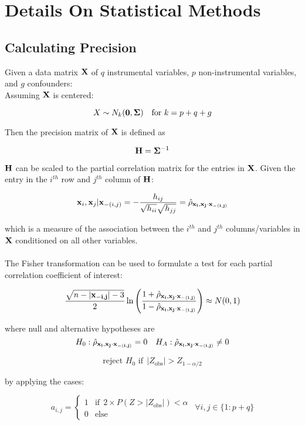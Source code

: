 \documentclass[12pt]{report}
\begin{document}
\section*{Details On Statistical Methods}

\subsection*{Calculating Precision}

Given a data matrix ${\bf X}$ of $q$ instrumental variables, $p$ non-instrumental variables, and $g$ confounders:\\
Assuming $\bf X$ is centered:

\[ X \sim N_k({\bf 0}, {\bf\Sigma})  \ \ \ \text{for} \ k=p+q+g\]
 
Then the precision matrix of $\bf X$ is defined as 

\[  {\bf H} = {\bf \Sigma}^{-1} \]

$\bf H$ can be scaled to the partial correlation matrix for the entries in $\bf X$. Given the entry in the $i^{th}$ row and $j^{th}$ column of $\bf H$:

\[  {\bf x}_i, {\bf x}_j | {\bf x}_{-(i,j)} = - \frac{h_{ij}}{\sqrt{h_{ii}}\sqrt{h_{jj}}} = \hat{\rho}_{\bf x_i,x_j\cdot x_{ -(i,j)}  }\]

which is a measure of the association between the $i^{th}$ and $j^{th}$ columns/variables in $\bf X$ conditioned on all other variables. \\
\\
The Fisher transformation can be used to formulate a test for each partial correlation coefficient of interest:

\[ \frac{\sqrt{n - |{\bf x_{-i,j}}| -3}}{2}\ln\left( \frac{1+\hat{\rho}_{\bf x_i,x_j\cdot x_{ -(i,j)}  }}{1-\hat{\rho}_{\bf x_i,x_j\cdot x_{ -(i,j)}  }} \right)  \approx N(0,1)\]

where null and alternative hypotheses are 
\[ H_0:  \hat{\rho}_{\bf x_i,x_j\cdot x_{ -(i,j)}  } = 0 \ \ \ H_A: \hat{\rho}_{\bf x_i,x_j\cdot x_{ -(i,j)}  }\neq 0\]

\[  \text{reject $H_0$ if} \ \  | Z_{\text{obs}}| > Z_{1-\alpha/2 }\]

by applying the cases:

\[  a_{i,j} = \begin{cases}1 & \text{if} \ \ 2\times P(Z>|Z_{\text{obs}}|)<\alpha \\
                                      0 & \text{else} 
  \end{cases} \ \ \forall i,j \in \{1:p+q\}\]
\end{document}
